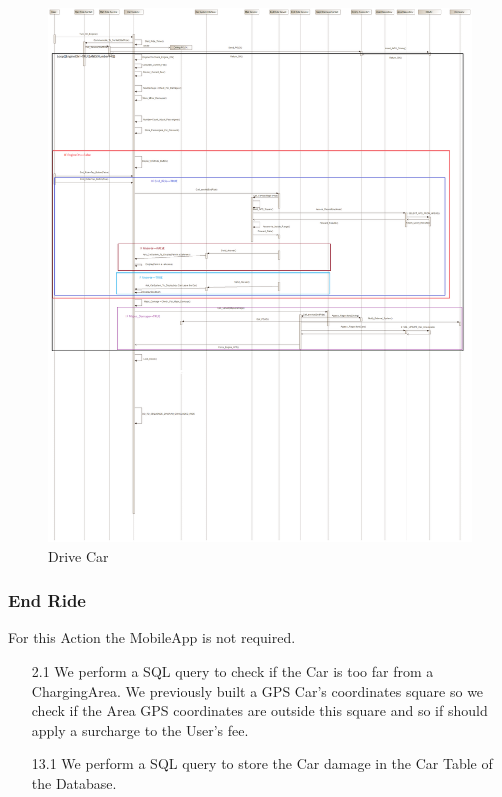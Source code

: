 \documentclass[12pt]{article}
\begin{document}
\begin{figure}[h]
\vspace{-3cm}
	\centering
	\includegraphics[width=.8\textwidth]{../Images/Sequence_Final/Drive_Car}
	\caption{Drive Car}
\end{figure}
\clearpage
\subsubsection{End Ride}
For this Action the MobileApp is not required.
\begin{enumerate}
	\item[2.1] We perform a SQL query to check if the Car is too far from a ChargingArea. We previously built a GPS Car’s coordinates square so we check if the Area GPS coordinates are outside this square and so if should apply a surcharge to the User’s fee.
	\item[13.1] We perform a SQL query to store the Car damage in the Car Table of the Database.
\end{enumerate}
\end{document}
